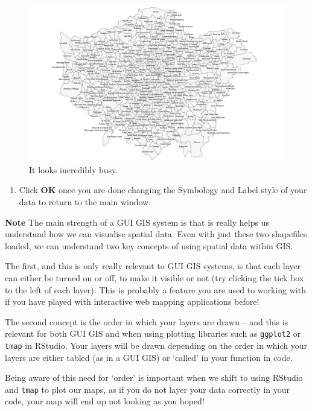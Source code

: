 \documentclass[
]{book}
\providecommand{\tightlist}{%
  \setlength{\itemsep}{0pt}\setlength{\parskip}{0pt}}
\begin{document}
\begin{figure}

{\centering \includegraphics[width=31.31in]{images/w02/wardlabels} 

}

\caption{It looks incredibly busy.}\label{fig:02-busy-labels}
\end{figure}

\begin{enumerate}
\def\labelenumi{\arabic{enumi}.}
\setcounter{enumi}{11}
\tightlist
\item
  Click \textbf{OK} once you are done changing the Symbology and Label style of your data to return to the main window.
\end{enumerate}

\textbf{Note}
The main strength of a GUI GIS system is that is really helps us understand how we can visualise spatial data. Even with just these two shapefiles loaded, we can understand two key concepts of using spatial data within GIS.

The first, and this is only really relevant to GUI GIS systems, is that each layer can either be turned on or off, to make it visible or not (try clicking the tick box to the left of each layer). This is probably a feature you are used to working with if you have played with interactive web mapping applications before!

The second concept is the order in which your layers are drawn -- and this is relevant for both GUI GIS and when using plotting libraries such as \texttt{ggplot2} or \texttt{tmap} in RStudio. Your layers will be drawn depending on the order in which your layers are either tabled (as in a GUI GIS) or `called' in your function in code.

Being aware of this need for `order' is important when we shift to using RStudio and \texttt{tmap} to plot our maps, as if you do not layer your data correctly in your code, your map will end up not looking as you hoped!
\end{document}
